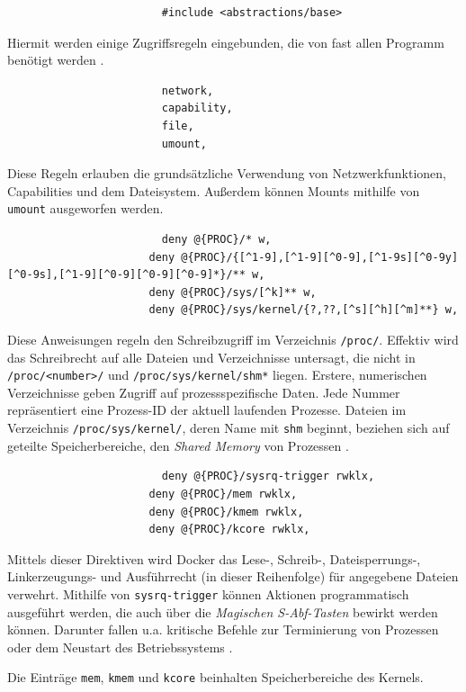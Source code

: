 \documentclass[../main.tex]{subfiles}
\begin{document}
					\begin{lstlisting}
						#include <abstractions/base>
					\end{lstlisting}
					Hiermit werden einige Zugriffsregeln eingebunden, die von fast allen Programm benötigt werden \cite[S.100]{SELinuxApparmor}.

					\begin{lstlisting}
						network,
						capability,
						file,
						umount,
					\end{lstlisting}
					Diese Regeln erlauben die grundsätzliche Verwendung von Netzwerkfunktionen, Capabilities und dem Dateisystem. Außerdem können Mounts mithilfe von \texttt{umount} ausgeworfen werden.

					\begin{lstlisting}
						deny @{PROC}/* w,
					  deny @{PROC}/{[^1-9],[^1-9][^0-9],[^1-9s][^0-9y][^0-9s],[^1-9][^0-9][^0-9][^0-9]*}/** w,
					  deny @{PROC}/sys/[^k]** w,
					  deny @{PROC}/sys/kernel/{?,??,[^s][^h][^m]**} w,
					\end{lstlisting}
					Diese Anweisungen regeln den Schreibzugriff im Verzeichnis \texttt{/proc/}. Effektiv wird das Schreibrecht auf alle Dateien und Verzeichnisse untersagt, die nicht in \texttt{/proc/<number>/} und \texttt{/proc/sys/kernel/shm*} liegen. Erstere, numerischen Verzeichnisse geben Zugriff auf prozessspezifische Daten. Jede Nummer repräsentiert eine Prozess-ID der aktuell laufenden Prozesse. Dateien im Verzeichnis \texttt{/proc/sys/kernel/}, deren Name mit \texttt{shm} beginnt, beziehen sich auf geteilte Speicherbereiche, den \emph{Shared Memory} von Prozessen \cite{apparmorShm}.

					\begin{lstlisting}
						deny @{PROC}/sysrq-trigger rwklx,
					  deny @{PROC}/mem rwklx,
					  deny @{PROC}/kmem rwklx,
					  deny @{PROC}/kcore rwklx,
					\end{lstlisting}
					Mittels dieser Direktiven wird Docker das Lese-, Schreib-, Dateisperrungs-, Linkerzeugungs- und Ausführrecht (in dieser Reihenfolge) für angegebene Dateien verwehrt. Mithilfe von \texttt{sysrq-trigger} können Aktionen programmatisch ausgeführt werden, die auch über die \emph{Magischen S-Abf-Tasten} bewirkt werden können. Darunter fallen u.a. kritische Befehle zur Terminierung von Prozessen oder dem Neustart des Betriebssystems \cite{apparmorMagicSysRQ}\cite{apparmorSysrqTrigger}.

					Die Einträge \texttt{mem}, \texttt{kmem} und \texttt{kcore} beinhalten Speicherbereiche des Kernels.
\end{document}
